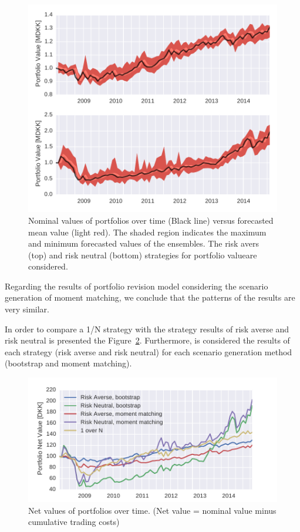 \begin{figure}[tp]
\centering
\includegraphics{../pic/trading_forecasted_value.pdf}
\caption{Nominal values of portfolios over time (Black line) versus forecasted mean value (light red). The shaded region indicates the maximum and minimum forecasted values of the ensembles. The risk avers (top) and risk neutral (bottom) strategies for portfolio valueare considered.}
\label{fig:tradingforecastedvalues}
\end{figure}

Regarding the results of portfolio revision model considering the scenario generation of moment matching, we conclude that the patterns of the results are very similar.

In order to compare a 1/N strategy with the strategy results of risk averse and risk neutral is presented the Figure~\ref{fig:tradingportfoliovalues}.
Furthermore, is considered the results of each strategy (risk averse and risk neutral) for each scenario generation method (bootstrap and moment matching).

\begin{figure}[tp]
\centering
\includegraphics{../pic/trading_portfolio_value.pdf}
\caption{Net values of portfolios over time. (Net value = nominal value minus cumulative trading costs)}
\label{fig:tradingportfoliovalues}
\end{figure}

